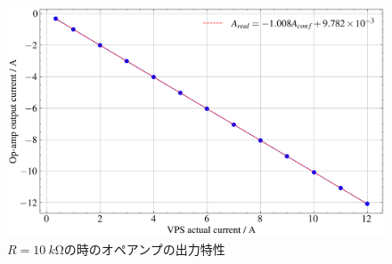 \begin{figure}[!htb]
	\centering
	\includegraphics[width=0.6\linewidth]{src/figures/consi3/10k-vps-op-amp-with-fit.png}
	\caption{$R=\SI{10}{k\ohm}$の時のオペアンプの出力特性}\label{fig:10k-vps-op-amp-with-fit}
\end{figure}
